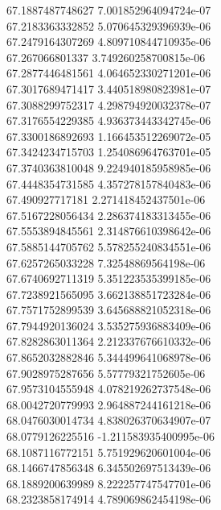 {67.1887487748627 7.001852964094724e-07 \\
67.2183363332852 5.070645329396939e-06 \\
67.2479164307269 4.809710844710935e-06 \\
67.267066801337 3.749260258700815e-06 \\
67.2877446481561 4.064652330271201e-06 \\
67.3017689471417 3.440518980823981e-07 \\
67.3088299752317 4.298794920032378e-07 \\
67.3176554229385 4.936373443342745e-06 \\
67.3300186892693 1.166453512269072e-05 \\
67.3424234715703 1.254086964763701e-05 \\
67.3740363810048 9.224940185958985e-06 \\
67.4448354731585 4.357278157840483e-06 \\
67.490927717181 2.271418452437501e-06 \\
67.5167228056434 2.286374183313455e-06 \\
67.5553894845561 2.314876610398642e-06 \\
67.5885144705762 5.578255240834551e-06 \\
67.6257265033228 7.32548869564198e-06 \\
67.6740692711319 5.351223535399185e-06 \\
67.7238921565095 3.662138851723284e-06 \\
67.7571752899539 3.645688821052318e-06 \\
67.7944920136024 3.535275936883409e-06 \\
67.8282863011364 2.212337676610332e-06 \\
67.8652032882846 5.344499641068978e-06 \\
67.9028975287656 5.57779321752605e-06 \\
67.9573104555948 4.078219262737548e-06 \\
68.0042720779993 2.964887244161218e-06 \\
68.0476030014734 4.838026370634907e-07 \\
68.0779126225516 -1.211583935400995e-06 \\
68.1087116772151 5.751929620601004e-06 \\
68.1466747856348 6.345502697513439e-06 \\
68.1889200639989 8.222257747547701e-06 \\
68.2323858174914 4.789069862454198e-06 \\
}
